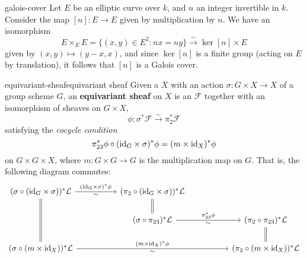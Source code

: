 \begin{example}{galois-cover}
    Let $E$ be an elliptic curve over $k$, and $n$ an integer invertible in $k$. Consider the map $[n] : E \to E$ given by multiplication by $n$. We have an isomorphism
    \[ E \times_E E = \{ (x, y) \in E^2 : nx = ny \} \xrightarrow{\sim} \ker [n] \times E \]
    given by $(x, y) \mapsto (y - x, x)$, and since $\ker [n]$ is a finite group (acting on $E$ by translation), it follows that $[n]$ is a Galois cover.
\end{example}

\begin{topic}{equivariant-sheaf}{equivariant sheaf}
    Given a  $X$ with an action $\sigma : G \times X \to X$ of a group scheme $G$, an \textbf{equivariant sheaf} on $X$ is an  $\mathcal{F}$ together with an isomorphism of sheaves on $G \times X$,
    \[ \phi : \sigma^* \mathcal{F} \xrightarrow{\sim} \pi_2^* \mathcal{F} \]
    satisfying the \textit{cocycle condition}
    \[ \pi_{23}^* \phi \circ (\text{id}_G \times \sigma)^* \phi = (m \times \text{id}_X)^* \phi \]
    on $G \times G \times X$, where $m : G \times G \to G$ is the multiplication map on $G$. That is, the following diagram commutes:
    \[ \begin{tikzcd}[column sep=5em]
        (\sigma \circ (\id_G \times \sigma))^* \mathcal{L} \arrow["\sim{}"']{r}{(\id_G \times \sigma)^* \phi} \arrow[equal]{dd} & (\pi_2 \circ (\id_G \times \sigma))^* \mathcal{L} \arrow[equal]{d} & \\ & (\sigma \circ \pi_{23})^* \mathcal{L} \arrow["\sim{}"']{r}{\pi_{23}^* \phi} & (\pi_2 \circ \pi_{23})^* \mathcal{L} \arrow[equal]{d} \\ (\sigma \circ (m \times \id_X))^* \mathcal{L} \arrow["\sim{}"']{rr}{(m \times \id_X)^* \phi} & & (\pi_2 \circ (m \times \id_X))^* \mathcal{L}
    \end{tikzcd} \]
\end{topic}

